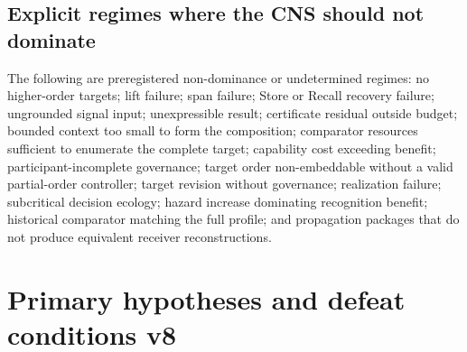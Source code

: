 \documentclass[11pt]{article}
\begin{document}
\subsection{Explicit regimes where the CNS should not dominate}

The following are preregistered non-dominance or undetermined regimes: no higher-order targets; lift failure; span failure; Store or Recall recovery failure; ungrounded signal input; unexpressible result; certificate residual outside budget; bounded context too small to form the composition; comparator resources sufficient to enumerate the complete target; capability cost exceeding benefit; participant-incomplete governance; target order non-embeddable without a valid partial-order controller; target revision without governance; realization failure; subcritical decision ecology; hazard increase dominating recognition benefit; historical comparator matching the full profile; and propagation packages that do not produce equivalent receiver reconstructions.

\section{Primary hypotheses and defeat conditions v8}
\end{document}
